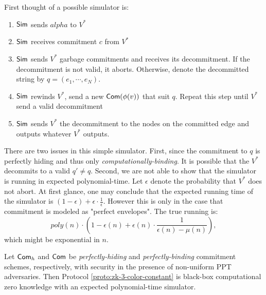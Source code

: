 \\ \\
First thought of a possible simulator is:
\begin{enumerate}
\item ${\sf Sim}$ sends $alpha$ to $V^*$
\item ${\sf Sim}$ receives commitment $c$ from $V^*$
\item ${\sf Sim}$ sends $V^*$ garbage commitments and receives its decommitment. If the decommitment is not valid, it aborts. Otherwise, denote the decommitted string by 
$q=(e_1,\cdots,e_N)$.
\item ${\sf Sim}$ rewinds $V^*$, send a new ${\sf Com}(\phi(v))$ that suit $q$. Repeat this step until $V^*$ send a valid decommitment
\item ${\sf Sim}$ sends $V^*$ the decommitment to the nodes on the committed edge and outputs whatever $V^*$ outputs.
\end{enumerate}
There are two issues in this simple simulator. First, since the commitment to $q$ is perfectly hiding and thus only {\it computationally-binding}. It is possible that the $V^*$ decommits to a valid $q'\neq q$. Second, we are not able to show that the simulator is running in expected polynomial-time. Let $\epsilon$ denote the probability that $V^*$ does not abort. At first glance, one may conclude that the expected running time of the simulator is $(1-\epsilon)+\epsilon\cdot\frac{1}{\epsilon}$. However this is only in the case that commitment is modeled as "perfect envelopes". The true running is:
$$poly(n)\cdot(1-\epsilon(n)+\epsilon(n)\cdot\frac{1}{\epsilon(n)-\mu(n)}),$$
which might be exponential in $n$.
\begin{theorem} Let ${\sf Com}_h$ and ${\sf Com}$ be {\it perfectly-hiding} and {\it perfectly-binding} commitment schemes, respectively, with security in the presence of non-uniform PPT adversaries. Then Protocol \ref{proto:zk-3-color-constant} is black-box computational zero knowledge with an expected polynomial-time simulator.
\end{theorem}
